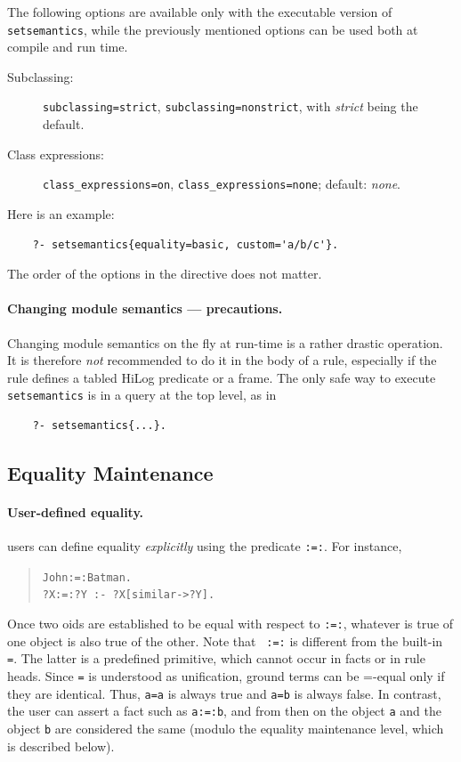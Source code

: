 \documentclass[11pt]{article}
\newcommand{\ERGO}{\mbox{\smaller{\ensuremath{\cal{E}}\smaller{{\sc{RGO}}}}}\xspace}
\newcommand{\FLSYSTEM}{\ERGO}
\begin{document}
The following options are available only with the executable version of
\texttt{setsemantics}, while the previously mentioned options can be used both
at compile and run time.
  \begin{description}
  \item[Subclassing:] \texttt{subclassing=strict},
    \texttt{subclassing=nonstrict}, with \emph{strict} being the default.    
  \item[Class expressions:] \texttt{class\_expressions=on},
    \texttt{class\_expressions=none}; default: \emph{none}.
  \end{description}
Here is an example:
\begin{verbatim}
    ?- setsemantics{equality=basic, custom='a/b/c'}.  
\end{verbatim}
The order of the options in the directive does not matter.

\paragraph{Changing module semantics --- precautions.}
Changing module semantics on the fly at run-time is a rather drastic operation.
It is therefore \emph{not} recommended to do it in the body of a rule,
especially if the rule defines a tabled HiLog predicate or a frame.
The only safe way to execute {\tt setsemantics} is in a query at the top
level, as in
  \begin{verbatim}
    ?- setsemantics{...}.
  \end{verbatim}


\subsection{Equality Maintenance}\label{sec-eqmaintain}


\paragraph{User-defined equality.}
\FLSYSTEM users can define equality \emph{explicitly}
using the predicate {\tt :=:}. For instance,
\begin{quote}
{\tt John:=:Batman.} \\
{\tt ?X:=:?Y :- ?X[similar->?Y].} \\
\end{quote}
Once two oids are established to be equal with respect to {\tt :=:},
whatever is true of one object is also true of the other. Note that {\tt
  :=:} is different from the built-in {\tt =}. The latter is a predefined
primitive, which cannot occur in facts or in rule heads.  
Since {\tt =} is understood as unification, ground terms can be 
  =-equal only if they are identical. Thus, {\tt a=a} is always true and
{\tt a=b} is always false. In contrast, the user can assert a fact such as
{\tt a:=:b}, and from then on the object {\tt a} and the object {\tt b} are
considered the same (modulo the equality maintenance level, which is
described below).       
\end{document}

